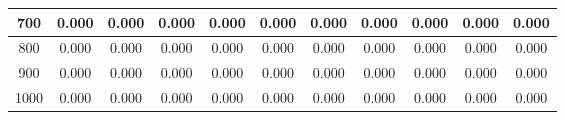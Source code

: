 \documentclass[11pt]{article}
\begin{document}
\begin{table}[h!]
\begin{tabular}{c|cccccccccc|}
\multicolumn{1}{|c|}{700} & \multicolumn{1}{c|}{0.000} & \multicolumn{1}{c|}{0.000} & \multicolumn{1}{c|}{0.000} & \multicolumn{1}{c|}{0.000} & \multicolumn{1}{c|}{0.000} & \multicolumn{1}{c|}{0.000} & \multicolumn{1}{c|}{0.000} & \multicolumn{1}{c|}{0.000} & \multicolumn{1}{c|}{0.000}  & 0.000 \\ \hline
\multicolumn{1}{|c|}{800} & \multicolumn{1}{c|}{0.000} & \multicolumn{1}{c|}{0.000} & \multicolumn{1}{c|}{0.000} & \multicolumn{1}{c|}{0.000} & \multicolumn{1}{c|}{0.000} & \multicolumn{1}{c|}{0.000} & \multicolumn{1}{c|}{0.000} & \multicolumn{1}{c|}{0.000} & \multicolumn{1}{c|}{0.000}  & 0.000 \\ \hline
\multicolumn{1}{|c|}{900} & \multicolumn{1}{c|}{0.000} & \multicolumn{1}{c|}{0.000} & \multicolumn{1}{c|}{0.000} & \multicolumn{1}{c|}{0.000} & \multicolumn{1}{c|}{0.000} & \multicolumn{1}{c|}{0.000} & \multicolumn{1}{c|}{0.000} & \multicolumn{1}{c|}{0.000} & \multicolumn{1}{c|}{0.000}  & 0.000 \\ \hline
\multicolumn{1}{|c|}{1000} & \multicolumn{1}{c|}{0.000} & \multicolumn{1}{c|}{0.000} & \multicolumn{1}{c|}{0.000} & \multicolumn{1}{c|}{0.000} & \multicolumn{1}{c|}{0.000} & \multicolumn{1}{c|}{0.000} & \multicolumn{1}{c|}{0.000} & \multicolumn{1}{c|}{0.000} & \multicolumn{1}{c|}{0.000}  & 0.000 \\ \hline
\end{tabular}
\end{table}
\end{document}
